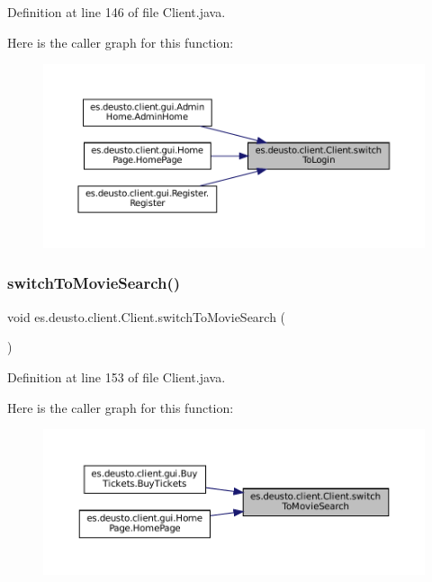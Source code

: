 Definition at line 146 of file Client.\+java.

Here is the caller graph for this function\+:
\nopagebreak
\begin{figure}[H]
\begin{center}
\leavevmode
\includegraphics[width=350pt]{classes_1_1deusto_1_1client_1_1_client_a66fff847d9f168900f6992fd4eff5e3d_icgraph}
\end{center}
\end{figure}
\mbox{\label{classes_1_1deusto_1_1client_1_1_client_a7cf818fce703324d74c896d9e4149dbe}} 
\subsubsection{\texorpdfstring{switchToMovieSearch()}{switchToMovieSearch()}}
{\footnotesize\ttfamily void es.\+deusto.\+client.\+Client.\+switch\+To\+Movie\+Search (\begin{DoxyParamCaption}{ }\end{DoxyParamCaption})}



Definition at line 153 of file Client.\+java.

Here is the caller graph for this function\+:
\nopagebreak
\begin{figure}[H]
\begin{center}
\leavevmode
\includegraphics[width=350pt]{classes_1_1deusto_1_1client_1_1_client_a7cf818fce703324d74c896d9e4149dbe_icgraph}
\end{center}
\end{figure}
\mbox{\label{classes_1_1deusto_1_1client_1_1_client_a8b292db7d6ec16eaa53b224bb7a33ab4}} 
